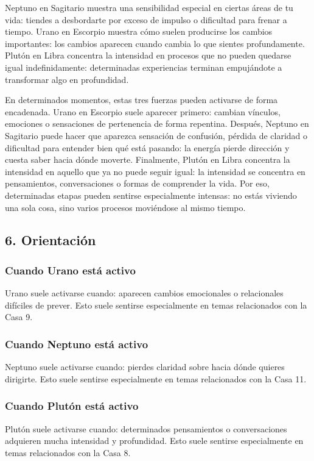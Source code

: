 \documentclass[11pt,a4paper]{article}
\begin{document}
Neptuno en Sagitario muestra una sensibilidad especial en ciertas áreas de tu vida: tiendes a desbordarte por exceso de impulso o dificultad para frenar a tiempo. Urano en Escorpio muestra cómo suelen producirse los cambios importantes: los cambios aparecen cuando cambia lo que sientes profundamente. Plutón en Libra concentra la intensidad en procesos que no pueden quedarse igual indefinidamente: determinadas experiencias terminan empujándote a transformar algo en profundidad.

En determinados momentos, estas tres fuerzas pueden activarse de forma encadenada. Urano en Escorpio suele aparecer primero: cambian vínculos, emociones o sensaciones de pertenencia de forma repentina. Después, Neptuno en Sagitario puede hacer que aparezca sensación de confusión, pérdida de claridad o dificultad para entender bien qué está pasando: la energía pierde dirección y cuesta saber hacia dónde moverte. Finalmente, Plutón en Libra concentra la intensidad en aquello que ya no puede seguir igual: la intensidad se concentra en pensamientos, conversaciones o formas de comprender la vida. Por eso, determinadas etapas pueden sentirse especialmente intensas: no estás viviendo una sola cosa, sino varios procesos moviéndose al mismo tiempo.

\vspace{0.8cm}

\subsection{6. Orientación}

\subsubsection*{Cuando Urano está activo}
Urano suele activarse cuando: aparecen cambios emocionales o relacionales difíciles de prever. Esto suele sentirse especialmente en temas relacionados con la Casa 9.

\subsubsection*{Cuando Neptuno está activo}
Neptuno suele activarse cuando: pierdes claridad sobre hacia dónde quieres dirigirte. Esto suele sentirse especialmente en temas relacionados con la Casa 11.

\subsubsection*{Cuando Plutón está activo}
Plutón suele activarse cuando: determinados pensamientos o conversaciones adquieren mucha intensidad y profundidad. Esto suele sentirse especialmente en temas relacionados con la Casa 8.
\end{document}
